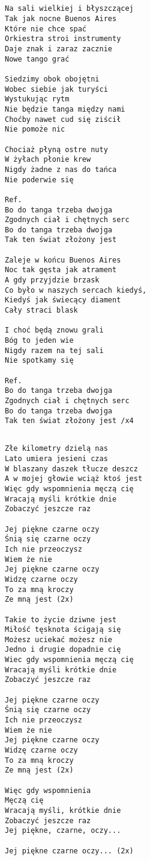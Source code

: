 \documentclass[12pt]{article}
\begin{document}
\subsection*{}
\begin{verbatim}
Na sali wielkiej i błyszczącej
Tak jak nocne Buenos Aires
Które nie chce spać
Orkiestra stroi instrumenty
Daje znak i zaraz zacznie
Nowe tango grać

Siedzimy obok obojętni
Wobec siebie jak turyści
Wystukując rytm
Nie będzie tanga między nami
Choćby nawet cud się ziścił
Nie pomoże nic

Chociaż płyną ostre nuty
W żyłach płonie krew
Nigdy żadne z nas do tańca
Nie poderwie się

Ref.
Bo do tanga trzeba dwojga
Zgodnych ciał i chętnych serc
Bo do tanga trzeba dwojga
Tak ten świat złożony jest

Zaleje w końcu Buenos Aires
Noc tak gęsta jak atrament
A gdy przyjdzie brzask
Co było w naszych sercach kiedyś,
Kiedyś jak świecący diament
Cały straci blask

I choć będą znowu grali
Bóg to jeden wie
Nigdy razem na tej sali
Nie spotkamy się

Ref.
Bo do tanga trzeba dwojga
Zgodnych ciał i chętnych serc
Bo do tanga trzeba dwojga
Tak ten świat złożony jest /x4
\end{verbatim}
\clearpage

\subsection*{}
\begin{verbatim}
Złe kilometry dzielą nas
Lato umiera jesieni czas
W blaszany daszek tłucze deszcz
A w mojej głowie wciąż ktoś jest
Więc gdy wspomnienia męczą cię
Wracają myśli krótkie dnie
Zobaczyć jeszcze raz

Jej piękne czarne oczy
Śnią się czarne oczy
Ich nie przeoczysz
Wiem że nie
Jej piękne czarne oczy
Widzę czarne oczy
To za mną kroczy
Ze mną jest (2x)

Takie to życie dziwne jest
Miłość tęsknota ścigają się
Możesz uciekać możesz nie
Jedno i drugie dopadnie cię
Wiec gdy wspomnienia męczą cię
Wracają myśli krótkie dnie
Zobaczyć jeszcze raz

Jej piękne czarne oczy
Śnią się czarne oczy
Ich nie przeoczysz
Wiem że nie
Jej piękne czarne oczy
Widzę czarne oczy
To za mną kroczy
Ze mną jest (2x)

Więc gdy wspomnienia
Męczą cię
Wracają myśli, krótkie dnie
Zobaczyć jeszcze raz
Jej piękne, czarne, oczy...

Jej piękne czarne oczy... (2x)
\end{verbatim}
\clearpage
\end{document}

